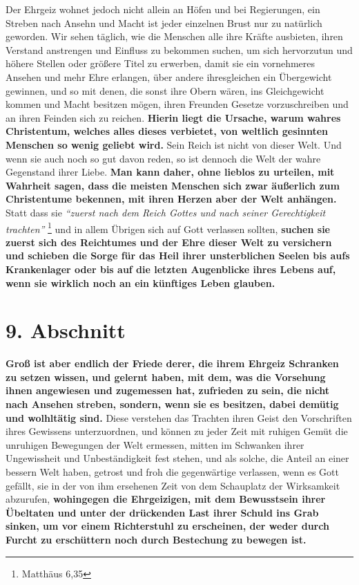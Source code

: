 Der Ehrgeiz wohnet jedoch nicht allein an Höfen und bei Regierungen, ein Streben
nach Ansehn und Macht ist jeder einzelnen Brust nur zu natürlich geworden. Wir
sehen täglich, wie die Menschen alle ihre Kräfte ausbieten, ihren Verstand
anstrengen und Einfluss zu bekommen suchen, um sich hervorzutun und höhere
Stellen oder größere Titel zu erwerben, damit sie ein vornehmeres Ansehen und
mehr Ehre erlangen, über andere ihresgleichen ein Übergewicht gewinnen, und so
mit denen, die sonst ihre Obern wären, ins Gleichgewicht kommen und Macht
besitzen mögen, ihren Freunden Gesetze vorzuschreiben und an ihren Feinden sich
zu reichen. 
\textbf{Hierin liegt die Ursache, warum wahres Christentum, welches alles
dieses verbietet, von weltlich gesinnten Menschen so wenig geliebt wird.} Sein
Reich ist nicht von dieser Welt. Und wenn sie auch noch so gut davon reden, so
ist dennoch die Welt der wahre Gegenstand ihrer Liebe. \textbf{Man kann daher, ohne
lieblos zu urteilen, mit Wahrheit sagen, dass die meisten Menschen sich zwar
äußerlich zum Christentume bekennen, mit ihren Herzen aber der Welt anhängen.}
Statt dass sie
\textit{"`zuerst nach dem Reich Gottes und nach seiner Gerechtigkeit
trachten"'}
\footnote{Matthäus 6,35}
und in allem Übrigen sich auf Gott verlassen
sollten, \textbf{suchen sie zuerst sich des Reichtumes und der Ehre dieser Welt zu
versichern und schieben die Sorge für das Heil ihrer unsterblichen Seelen bis
aufs Krankenlager oder bis auf die letzten Augenblicke ihres Lebens auf, wenn
sie wirklich noch an ein künftiges Leben glauben.}

\section{9. Abschnitt} \label{kap8_ab9}

\textbf{Groß ist aber endlich der Friede derer, die ihrem Ehrgeiz Schranken zu setzen
wissen, und gelernt haben, mit dem, was die Vorsehung ihnen angewiesen und
zugemessen hat, zufrieden zu sein, die nicht nach Ansehen streben, sondern, wenn
sie es besitzen, dabei demütig und wolhltätig sind.} Diese verstehen das
Trachten ihren Geist den Vorschriften ihres Gewissens unterzuordnen, und
können zu jeder Zeit mit ruhigen Gemüt die unruhigen Bewegungen der Welt
ermessen, mitten im Schwanken ihrer Ungewissheit und Unbeständigkeit fest stehen,
und als solche, die Anteil an einer bessern Welt haben, getrost und froh die
gegenwärtige verlassen, wenn es Gott gefällt, sie in der von ihm ersehenen Zeit
von dem Schauplatz der Wirksamkeit abzurufen, \textbf{wohingegen die Ehrgeizigen, mit
dem Bewusstsein ihrer Übeltaten und unter der drückenden Last ihrer Schuld ins
Grab sinken, um vor einem Richterstuhl  zu erscheinen, der weder durch Furcht zu
erschüttern noch durch Bestechung zu bewegen ist.}

